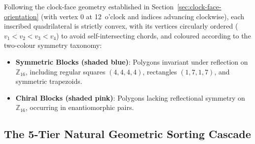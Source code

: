 Following the clock-face geometry established in Section~\ref{sec:clock-face-orientation} (with vertex $0$ at 12~o'clock and indices advancing clockwise), each inscribed quadrilateral is strictly convex, with its vertices circularly ordered ($v_1 < v_2 < v_3 < v_4$) to avoid self-intersecting chords, and coloured according to the two-colour symmetry taxonomy:
\begin{itemize}
    \item \textbf{Symmetric Blocks (shaded blue)}: Polygons invariant under reflection on $\mathbb{Z}_{16}$, including regular squares $(4,4,4,4)$, rectangles $(1,7,1,7)$, and symmetric trapezoids.
    \item \textbf{Chiral Blocks (shaded pink)}: Polygons lacking reflectional symmetry on $\mathbb{Z}_{16}$, occurring in enantiomorphic pairs.
\end{itemize}

\subsection{The 5-Tier Natural Geometric Sorting Cascade}

